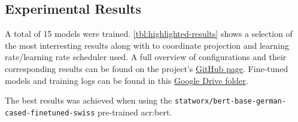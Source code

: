 \subsection{Experimental Results}
\label{sec:experimentalResults}

\begin{comment}
Results should be clearly displayed and should provide a suitable representation of your results for the points you wish to make.
Graphs should be labeled in a legible font. If more than one result is displayed in the same graph, then these should be clearly marked.
Please choose carefully rather than presenting every result.
Too much information is hard to read and often hides the key information you wish to present.
Make use of statistical methods when presenting results, where possible to strengthen the results.
Further, the format of the presentation of results should be chosen based on what issues in the results you wish to highlight.
You may wish to present a subset in the experimental section and provide additional results in an appendix.
If there are specific points related to one experiment that you want to discuss in more detail, it could be reasonable to do
that already in this section; however, save the main overall discussion for Section~\ref{sec:Discussion}.
\end{comment}

A total of 15 models were trained. \autoref{tbl:highlighted-results} shows a selection of the most interresting results along with to coordinate projection and learning rate/learning rate scheduler used. A full overview of configurations and their corresponding results can be found on the project's \href{https://github.com/oskarhlm/TDT13}{GitHub page}. Fine-tuned models and training logs can be found in this \href{https://drive.google.com/drive/folders/1-6nAdhvf5DBHtWzpZa6iH7z0dFETi80h?usp=sharing}{Google Drive folder}.

The best results was achieved when using the \texttt{statworx/bert-base-german-cased-finetuned-swiss} pre-trained \acrshort{acr:bert}.

